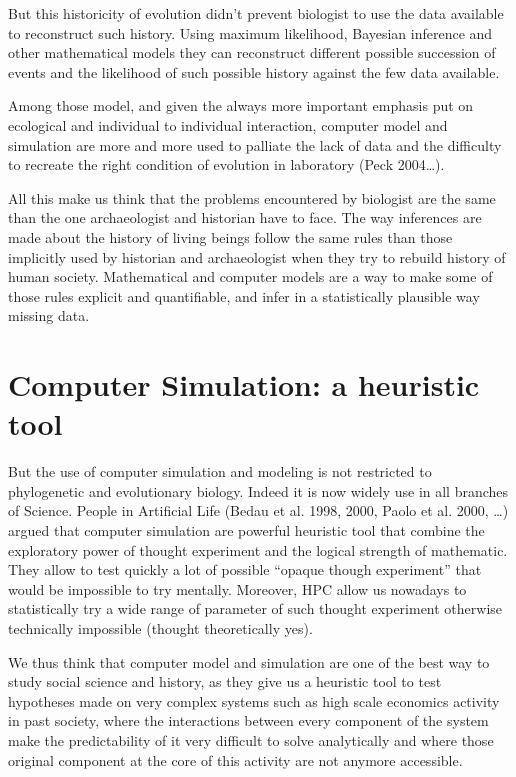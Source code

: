 \documentclass[a4paper]{article}
\begin{document}
But this historicity of evolution didn't prevent biologist to use the data available to reconstruct such history. Using maximum likelihood, Bayesian inference and other mathematical models they can reconstruct different possible succession of events and the likelihood of such possible history against the few data available.

Among those model, and given the always more important emphasis put on ecological and individual to individual interaction, computer model and simulation are more and more used to palliate the lack of data and the difficulty to recreate the right condition of evolution in laboratory (Peck 2004\ldots).

All this make us think that the problems encountered by biologist are the same than the one archaeologist and historian have to face. The way inferences are made about the history of living beings follow the same rules than those implicitly used by historian and archaeologist when they try to rebuild history of human society. Mathematical and computer models are a way to make some of those rules explicit and quantifiable, and infer in a statistically plausible way missing data.

\section{Computer Simulation: a heuristic tool}
But the use of computer simulation and modeling is not restricted to phylogenetic and evolutionary biology. Indeed it is now widely use in all branches of Science. People in Artificial Life (Bedau et al. 1998, 2000, Paolo et al. 2000, \ldots) argued that computer simulation are powerful heuristic tool that combine the exploratory power of thought experiment and the logical strength of mathematic. They allow to test quickly a lot of possible ``opaque though experiment'' that would be impossible to try mentally.
Moreover, HPC allow us nowadays to statistically try a wide range of parameter of such thought experiment otherwise technically impossible (thought theoretically yes).

We thus think that computer model and simulation are one of the best way to study social science and history, as they give  us a heuristic tool to test hypotheses made on very complex systems such as high scale economics activity in past society, where the interactions between every component of the system make the predictability of it very difficult to solve analytically and where those original component at the core of this activity are not anymore accessible.
\end{document}

